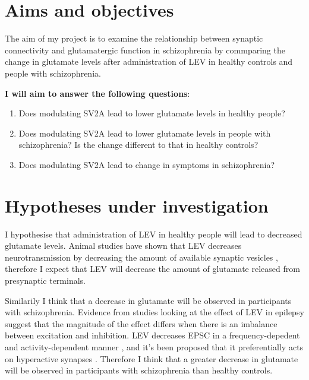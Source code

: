 \documentclass[
  letterpaper,
  DIV=11,
  numbers=noendperiod]{scrartcl}
\providecommand{\tightlist}{%
  \setlength{\itemsep}{0pt}\setlength{\parskip}{0pt}}\usepackage{longtable,booktabs,array}
\begin{document}
\section{Aims and objectives}\label{aims-and-objectives}

The aim of my project is to examine the relationship between synaptic
connectivity and glutamatergic function in schizophrenia by commparing
the change in glutamate levels after administration of LEV in healthy
controls and people with schizophrenia.

\textbf{I will aim to answer the following questions}:

\begin{enumerate}
\def\labelenumi{\arabic{enumi}.}
\tightlist
\item
  Does modulating SV2A lead to lower glutamate levels in healthy people?
\item
  Does modulating SV2A lead to lower glutamate levels in people with
  schizophrenia? Is the change different to that in healthy controls?
\item
  Does modulating SV2A lead to change in symptoms in schizophrenia?
\end{enumerate}

\section{Hypotheses under
investigation}\label{hypotheses-under-investigation}

I hypothesise that administration of LEV in healthy people will lead to
decreased glutamate levels. Animal studies have shown that LEV decreases
neurotransmission by decreasing the amount of available synaptic
vesicles \autocite{meehan_new_2011}, therefore I expect that LEV will
decrease the amount of glutamate released from presynaptic terminals.

Similarily I think that a decrease in glutamate will be observed in
participants with schizophrenia. Evidence from studies looking at the
effect of LEV in epilepsy suggest that the magnitude of the effect
differs when there is an imbalance between excitation and inhibition.
LEV decreases EPSC in a frequency-depedent and activity-dependent manner
\autocite{meehan_levetiracetam_2012}, and it's been proposed that it
preferentially acts on hyperactive synapses
\autocite{meehan_new_2011,loscher_synaptic_2016}. Therefore I think that
a greater decrease in glutamate will be observed in participants with
schizophrenia than healthy controls.
\end{document}
